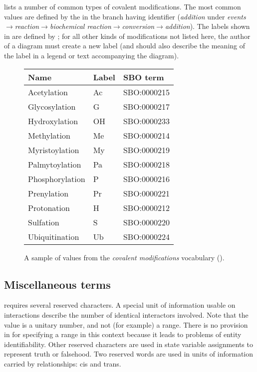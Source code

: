 lists a number of common types of covalent modifications.  The most common values are defined by the \sbo in the branch having identifier  (\emph{addition} under \emph{events}$\rightarrow$\emph{reaction}$\rightarrow$\emph{biochemical reaction}$\rightarrow$\emph{conversion}$\rightarrow$\emph{addition}).  The labels shown in  are defined by \SBGNERLone; for all other kinds of modifications not listed here, the author of a \ER diagram must create a new label (and should also describe the meaning of the label in a legend or text accompanying the diagram).

\begin{figure}[h]
  \centering
  \begin{tabular}{l>{\ttfamily}ll}
    \toprule
    \textbf{Name}   & \textbf{\rmfamily Label} & \textbf{SBO term} \\
    \midrule
    Acetylation     & Ac    & SBO:0000215\\
    Glycosylation   & G     & SBO:0000217\\
    Hydroxylation   & OH    & SBO:0000233\\
    Methylation     & Me    & SBO:0000214\\
    Myristoylation  & My    & SBO:0000219\\
    Palmytoylation  & Pa    & SBO:0000218\\
    Phosphorylation & P     & SBO:0000216\\
    Prenylation     & Pr    & SBO:0000221\\
    Protonation     & H     & SBO:0000212\\
    Sulfation       & S     & SBO:0000220\\
    Ubiquitination  & Ub    & SBO:0000224\\
    \bottomrule
  \end{tabular}
  \caption{A sample of values from the \emph{covalent modifications} vocabulary
    ().}
  \label{fig:covalent-mod-cv}
\end{figure}

\subsection{Miscellaneous terms}
\label{sec:miscellaneous-cv}

\SBGNERLone requires several reserved characters. A special unit of information usable on interactions describe the number of identical interactors involved. Note that the value is a unitary number, and not (for example) a range.  There is no provision in \SBGNPDLone for specifying a range in this context because it leads to problems of entity identifiability. Other reserved characters are used in state variable assignments to represent truth or falsehood. Two reserved words are used in units of information carried by relationships: cis and trans. 

